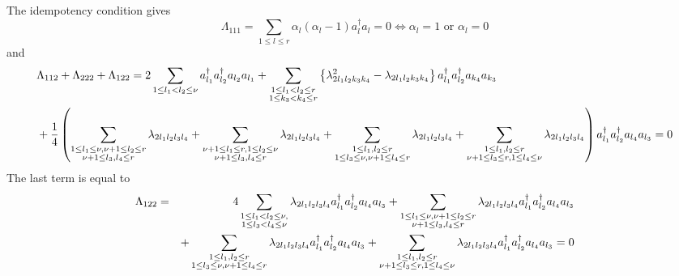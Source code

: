 \documentclass[12pt]{article}
\begin{document}
The idempotency condition gives 
\begin{equation}
\Lambda _{111}=\sum_{1\leq l\leq r}\alpha _{l}\left( \alpha _{l}-1\right)
a_{l}^{\dagger }a_{l}=0\Leftrightarrow \alpha _{l}=1\text{ or }\alpha _{l}=0
\end{equation}%
and 
\begin{align}
& \Lambda _{112}+\Lambda _{222}+\Lambda _{122}=2\sum_{1\leq l_{1}<l_{2}\leq
\nu }a_{l_{1}}^{\dagger }a_{l_{2}}^{\dagger }a_{l_{2}}a_{l_{1}}+\sum
_{\substack{ 1\leq l_{1}<l_{2}\leq r \\ 1\leq k_{3}<k_{4}\leq r}}\left\{
\lambda _{2l_{1}l_{2}k_{3}k_{4}}^{2}-\lambda
_{2l_{1}l_{2}k_{3}k_{4}}\right\} a_{l_{1}}^{\dagger }a_{l_{2}}^{\dagger
}a_{k_{4}}a_{k_{3}}  \notag \\
& +\frac{1}{4}\left( \sum_{\substack{ 1\leq l_{1}\leq \nu ,\nu +1\leq
l_{2}\leq r \\ \nu +1\leq l_{3},l_{4}\leq r}}\lambda
_{2l_{1}l_{2}l_{3}l_{4}}+\sum_{\substack{ \nu +1\leq l_{1}\leq r,1\leq
l_{2}\leq \nu  \\ \nu +1\leq l_{3},l_{4}\leq r}}\lambda
_{2l_{1}l_{2}l_{3}l_{4}}+\sum_{\substack{ 1\leq l_{1},l_{2}\leq r \\ 1\leq
l_{3}\leq \nu ,\nu +1\leq l_{4}\leq r}}\lambda _{2l_{1}l_{2}l_{3}l_{4}}+\sum
_{\substack{ 1\leq l_{1},l_{2}\leq r \\ \nu +1\leq l_{3}\leq r,1\leq
l_{4}\leq \nu }}\lambda _{2l_{1}l_{2}l_{3}l_{4}}\right) a_{l_{1}}^{\dagger
}a_{l_{2}}^{\dagger }a_{l_{4}}a_{l_{3}}=0
\end{align}%
The last term is equal to%
\begin{eqnarray}
\Lambda _{122} &=&4\sum_{\substack{ 1\leq l_{1}<l_{2}\leq \nu , \\ 1\leq
l_{3}<l_{4}\leq \nu }}\lambda _{2l_{1}l_{2}l_{3}l_{4}}a_{l_{1}}^{\dagger
}a_{l_{2}}^{\dagger }a_{l_{4}}a_{l_{3}}+\sum_{\substack{ 1\leq l_{1}\leq \nu
,\nu +1\leq l_{2}\leq r \\ \nu +1\leq l_{3},l_{4}\leq r}}\lambda
_{2l_{1}l_{2}l_{3}l_{4}}a_{l_{1}}^{\dagger }a_{l_{2}}^{\dagger
}a_{l_{4}}a_{l_{3}}  \notag \\
&&+\sum_{\substack{ 1\leq l_{1},l_{2}\leq r \\ 1\leq l_{3}\leq \nu ,\nu
+1\leq l_{4}\leq r}}\lambda _{2l_{1}l_{2}l_{3}l_{4}}a_{l_{1}}^{\dagger
}a_{l_{2}}^{\dagger }a_{l_{4}}a_{l_{3}}+\sum_{\substack{ 1\leq
l_{1},l_{2}\leq r \\ \nu +1\leq l_{3}\leq r,1\leq l_{4}\leq \nu }}\lambda
_{2l_{1}l_{2}l_{3}l_{4}}a_{l_{1}}^{\dagger }a_{l_{2}}^{\dagger
}a_{l_{4}}a_{l_{3}}\left. =\right. 0
\end{eqnarray}%
\end{document}
